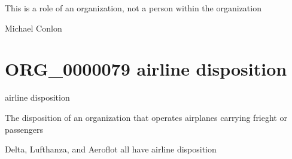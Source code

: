 \documentclass[letterpaper,10pt,english]{sphinxmanual}
\begin{document}
\begin{sphinxShadowBox}

\sphinxAtStartPar
This is a role of an organization, not a person within the organization
\end{sphinxShadowBox}

\begin{sphinxShadowBox}

\sphinxAtStartPar
Michael Conlon 
\end{sphinxShadowBox}
\begin{quote}
\label{\detokenize{doc-ORG_0000079:org-0000079}}\label{\detokenize{doc-ORG_0000079:airline-disposition}}\label{\detokenize{doc-ORG_0000079:org-0000079}}
\ignorespaces \end{quote}


\section{ORG\_0000079 \sphinxhyphen{} airline disposition}
\label{\detokenize{doc-ORG_0000079:org-0000079-airline-disposition}}\label{\detokenize{doc-ORG_0000079:index-0}}\label{\detokenize{doc-ORG_0000079::doc}}
\begin{sphinxShadowBox}

\sphinxAtStartPar
airline disposition
\end{sphinxShadowBox}

\begin{sphinxShadowBox}

\sphinxAtStartPar
The disposition of an organization that operates airplanes carrying frieght or passengers
\end{sphinxShadowBox}

\begin{sphinxShadowBox}

\sphinxAtStartPar
{}
\end{sphinxShadowBox}

\begin{sphinxShadowBox}

\sphinxAtStartPar
Delta, Lufthanza, and Aeroflot all have airline disposition
\end{sphinxShadowBox}
\end{document}
